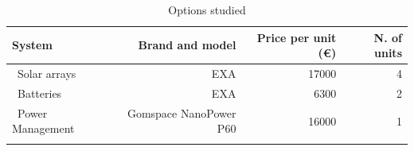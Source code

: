 \begin{longtable}{| l | r | r | r | }
\hline
\rowcolor[gray]{0.80}	\textbf{System} &  \textbf{Brand and model}     & \textbf{Price per unit (\euro)}  & \textbf{N. of units}  \\
\hline
\endfirsthead

	   ~Solar arrays & EXA & 17000 & 4\\
	   ~Batteries & EXA & 6300 & 2 \\
	   ~Power Management & Gomspace NanoPower P60 & 16000 & 1 \\
	\hline

\caption{Options studied}
\label{epsfinal}
\end{longtable}